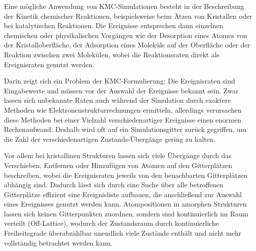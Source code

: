 Eine mögliche Anwendung von KMC-Simulationen besteht in der Beschreibung der Kinetik chemischer Reaktionen, beispielsweise beim Ätzen von Kristallen\cite{gosalvez_atomistic_2008} oder bei katalytischen Reaktionen\cite{stamatakis_unraveling_2012}.
Die Ereignisse entsprechen dann einzelnen chemischen oder physikalischen Vorgängen wie der Desorption eines Atomes von der Kristalloberfläche, der Adsorption eines Moleküls auf der Oberfläche oder der Reaktion zwischen zwei Molekülen, wobei die Reaktionsraten direkt als Ereignisraten genutzt werden.

Darin zeigt sich ein Problem der KMC-Formulierung:
Die Ereignisraten sind Eingabewerte und müssen vor der Auswahl der Ereignisse bekannt sein.
Zwar lassen sich unbekannte Raten auch während der Simulation durch exaktere Methoden wie Elektronenstrukturrechnungen ermitteln\cite{stamatakis_unraveling_2012}, allerdings verursachen diese Methoden bei einer Vielzahl verschiedenartiger Ereignisse einen enormen Rechenaufwand.
Deshalb wird oft auf ein Simulationsgitter zurück gegriffen, um die Zahl der verschiedenartigen Zustands-Übergänge gering zu halten.

Vor allem bei kristallinen Strukturen lassen sich viele Übergänge durch das Verschieben, Entfernen oder Hinzufügen von Atomen auf den Gitterplätzen beschreiben, wobei die Ereignisraten jeweils von den benachbarten Gitterplätzen abhängig sind.
Dadurch lässt sich durch eine Suche über alle betroffenen Gitterplätze effizient eine Ereignisliste aufbauen, die anschließend zur Auswahl eines Ereignisses genutzt werden kann.
Atompositionen in amorphen Strukturen lassen sich keinen Gitterpunkten zuordnen, sondern sind kontinuierlich im Raum verteilt (Off-Lattice), wodurch der Zustandsraum durch kontinuierliche Freiheitsgrade überabzählbar unendlich viele Zustände enthält und nicht mehr vollständig betrachtet werden kann.

